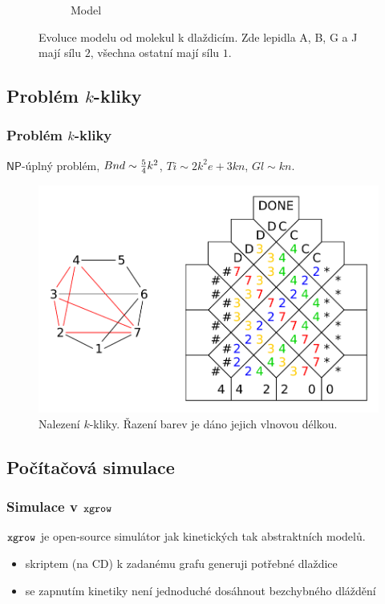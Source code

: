 \documentclass[10pt]{beamer}
\newcommand{\NP}{\mathsf{NP}}
\theoremstyle{definition}
\theoremstyle{remark}
\begin{document}
\begin{frame}
\begin{figure}[H]
\begin{center}
\begin{subfigure}[b]{0.25\textwidth}
			\caption{Model}
		\end{subfigure}
		\caption{Evoluce modelu od molekul k dlaždicím. Zde lepidla {\sf A}, {\sf B}, {\sf G} a {\sf J} mají sílu $2$, všechna ostatní mají sílu $1$.}
		\label{fig:evolution}
	\end{center}
	\end{figure}
\end{frame}

\subsection{Problém $k$-kliky}
\begin{frame}
\frametitle{Problém $k$-kliky}
	$\NP$-úplný problém, $Bnd \sim \nicefrac{5}{4}k^2$, $Ti \sim 2k^2e + 3kn$, $Gl \sim kn$.
	\begin{figure}[h]
	\begin{center}
		\includegraphics[scale=0.6]{../figures/k-clique/k-clique.pdf}
		\caption{Nalezení $k$-kliky. Řazení barev je dáno jejich vlnovou délkou.}
	\end{center}
	\end{figure}
\end{frame}

\subsection{Počítačová simulace}
\begin{frame}
\frametitle{Simulace v $\tt xgrow$}
	$\tt xgrow$ je open-source simulátor jak kinetických tak abstraktních modelů.
	\begin{itemize}
		\item skriptem (na CD) k zadanému grafu generuji potřebné dlaždice
		\item se zapnutím kinetiky není jednoduché dosáhnout bezchybného dláždění
	\end{itemize}
\end{frame}
\end{document}
